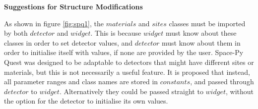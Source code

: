 \documentclass{article}
\begin{document}
\par
\textbf{Suggestions for Structure Modifications}
\par
As shown in figure \ref{fig:spq1}, the $materials$ and $sites$ classes must be imported by both $detector$ and $widget$. This is because $widget$ must know about these classes in order to set detector values, and $detector$ must know about them in order to initialise itself with values, if none are provided by the user. Space-Py Quest was designed to be adaptable to detectors that might have different sites or materials, but this is not necessarily a useful feature.  It is proposed that instead, all parameter ranges and class names are stored in $constants$, and passed through $detector$ to $widget$. Alternatively they could be passed straight to $widget$, without the option for the detector to initialise its own values. 
\end{document}
